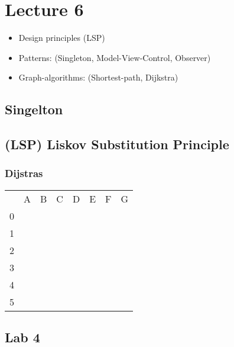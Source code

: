 \documentclass[11pt]{amsart}
\begin{document}
\section{Lecture 6}

\begin{itemize}
  \item Design principles (LSP)
  \item Patterns: (Singleton, Model-View-Control, Observer)
  \item Graph-algorithms: (Shortest-path, Dijkstra)
\end{itemize}

\subsection{Singelton}



\subsection{(LSP) Liskov Substitution Principle}


\subsubsection{Dijstras}

\begin{tabular}{| l | c | c | c | c | c | c | c |}
 & A & B & C & D & E & F & G \\ 
0 & & & & & & &\\
1 & & & & & & &\\
2 & & & & & & &\\
3 & & & & & & &\\
4 & & & & & & &\\
5 & & & & & & &\\

\end{tabular}


\subsection{Lab 4}

\end{document}

